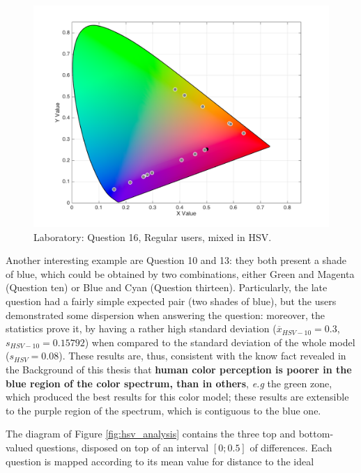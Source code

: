 \begin{enumerate}
\begin{figure}[!htbp]
\begin{minipage}{0.4\textwidth}
      \centering
      \includegraphics[width=\textwidth]{images/results/16_lab_HSVresponses.png}
      \caption[Laboratory: Answers for Question 16, from regular users, mixed in HSV Color Model.]{Laboratory: Question 16, Regular users, mixed in HSV.}
      \label{fig:labhsvregular_16}
    \end{minipage}
    \vspace{-5pt}
  \end{figure}
\end{enumerate} \par
%
Another interesting example are Question 10 and 13: they both present a shade of blue, which could be obtained by two combinations, either Green and Magenta (Question ten) or Blue and Cyan (Question thirteen). Particularly, the
late question had a fairly simple expected pair (two shades of blue), but the users demonstrated some dispersion when answering the question: moreover, the statistics prove it, by having a rather high standard deviation
($\overline{x}_{HSV-10} = 0.3$, $s_{HSV-10} = 0.15792$) when compared to the standard deviation of the whole model ($s_{HSV} = 0.08$). These results are, thus, consistent with the know fact revealed in the Background of this thesis that
\textbf{human color perception is poorer in the blue region of the color spectrum, than in others}, \emph{e.g} the green zone, which produced the best results for this color model; these results are extensible to the purple region
of the spectrum, which is contiguous to the blue one. \par
%
The diagram of Figure \ref{fig:hsv_analysis} contains the three top and bottom-valued questions, disposed on top of an interval $[0 ; 0.5]$ of differences. Each question is mapped according to its mean value for distance to the ideal
